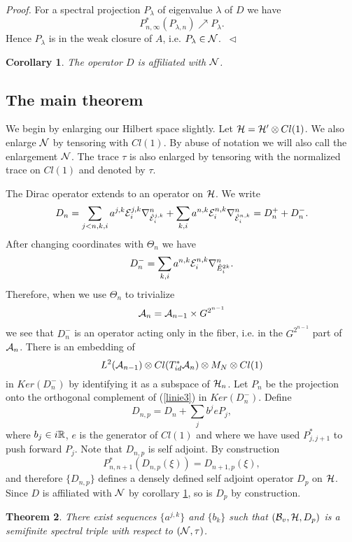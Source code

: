 \documentclass[12pt]{article}
\newcommand{\eproof}{{~\hfill$ \triangleleft$}}
\def\ca{{\cal A}}
\def\cb{{\cal B}}
\def\ce{{\cal E}}
\def\ch{{\cal H}}
\def\cn{{\cal N}}
\newtheorem{thm}{Theorem}[subsection]
\newtheorem{cor}[thm]{Corollary}
\newcommand{\bbR}{{\Bbb R}}
\begin{document}
{\textit{Proof.} For a spectral projection $P_\lambda$ of eigenvalue $\lambda$ of $D$ we have 
$$P_{n,\infty}^*(P_{\lambda ,n}) \nearrow P_\lambda .$$
Hence $P_\lambda$ is in the weak closure of $A$, i.e. $P_\lambda \in \cn$. \eproof 

\begin{cor}\label{affil}
The operator $D$ is affiliated with $\cn$. 
\end{cor}


\subsection{The main theorem}
We begin by enlarging our Hilbert space slightly. Let $\ch=\ch'\otimes Cl(1)$. We also enlarge $\cn$ by tensoring with $Cl(1)$. By abuse of notation we will also call the enlargement $\cn$. The trace $\tau$ is also enlarged by tensoring with the normalized trace on $Cl(1)$ and denoted by $\tau$.

The Dirac operator  extends to an operator on $\ch$. We write
$$D_n= \sum_{j < n,k,i}a^{j,k}\ce_i^{j,k}\nabla^n_{\hat{\ce}_i^{j,k}}+\sum_{k,i}a^{n,k}\ce_i^{n,k}\nabla^n_{\hat{\ce}_i^{n,k}}=D_n^++D_n^-.$$ 
After changing coordinates with $\Theta_n$ we have 
$$D_n^-=\sum_{k,i}a^{n,k}\ce_i^{n,k}\nabla^n_{\hat{E}_i^{2k}}.$$
Therefore, when we use $\Theta_n$ to trivialize 
$$\ca_{n}=\ca_{n-1}\times G^{2^{n-1}}$$ we see that $D_n^-$ is an operator acting  only in the fiber, i.e. in the $G^{2^{n-1}}$ part of $\ca_{n}$. There is an embedding of 
\begin{equation} 
 L^2(\ca_{n-1})\otimes Cl(T^*_{id}\ca_{n})\otimes M_N\otimes Cl(1)
\label{linie3}
\end{equation}
 in $Ker (D^-_n)$ by identifying it as a subspace of $\ch_n$. Let $P_n$ be the projection onto the orthogonal complement of (\ref{linie3}) in $Ker (D^-_n)$. Define
$$D_{n,p}=D_n+\sum_j b^jeP_j,$$
where $b_j\in i \bbR$, $e$ is the generator of $Cl(1)$ and where we have used $P_{j,{j+1}}^*$ to push forward $P_j$. 
Note that $D_{n,p}$ is self adjoint. By construction 
$$P_{n,n+1}^*(D_{n,p}(\xi))=D_{n+1,p} (\xi),$$
and therefore $\{ D_{n,p}\}$ defines a densely defined self adjoint operator $D_p$ on $\ch$. Since $D$ is affiliated with $\cn$ by corollary \ref{affil}, so is $D_p$ by construction.   
\begin{thm} \label{hoved}
There exist sequences $\{ a^{j,k} \}$ and $\{ b_k\}$ such that $(\cb_v ,\ch  ,D_p )$ is a semifinite spectral triple with respect to $(\cn ,\tau)$.
\end{thm}

}
\end{document}
